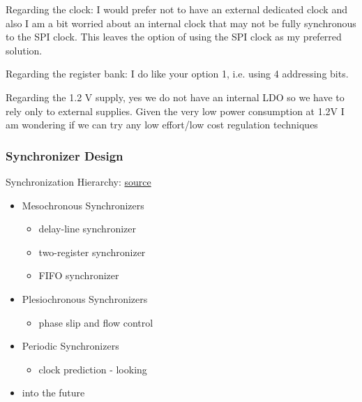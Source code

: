 Regarding the clock:
I would prefer not to have an external dedicated clock and also I am a bit worried about an internal clock that may not be fully synchronous to the SPI clock. This leaves the option of using the SPI clock as my preferred solution. 

Regarding the register bank:
I do like your option 1, i.e. using 4 addressing bits.%

Regarding the 1.2 \unit{\volt} supply, yes we do not have an internal LDO so we have to rely only to external supplies. Given the very low power consumption at 1.2V I am wondering if we can try any low effort/low cost regulation techniques


\subsubsection{Synchronizer Design} 

Synchronization Hierarchy: \href{http://cva.stanford.edu/books/dig_sys_engr/lectures/l14.pdf}{source}

\begin{itemize} %
    \item Mesochronous Synchronizers
    \begin{itemize}
        \item delay-line synchronizer
        \item two-register synchronizer
        \item FIFO synchronizer
    \end{itemize}
    \item Plesiochronous Synchronizers
    \begin{itemize}
        \item phase slip and flow control
    \end{itemize}
    \item Periodic Synchronizers
    \begin{itemize}
        \item clock prediction - looking
    \end{itemize}
    \item into the future
\end{itemize}



